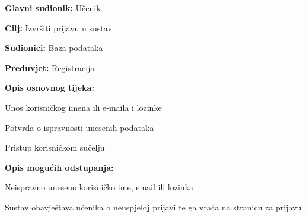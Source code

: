 					\noindent {}
					\begin{packed_item}
	
						\item \textbf{Glavni sudionik: }Učenik
						\item  \textbf{Cilj:} Izvršiti prijavu u sustav
						\item  \textbf{Sudionici:} Baza podataka
						\item  \textbf{Preduvjet:} Registracija
						\item  \textbf{Opis osnovnog tijeka:}
						
						\item[] \begin{packed_enum}
	
							\item Unos korisničkog imena ili e-maila i lozinke
							\item Potvrda o ispravnosti unesenih podataka
							\item Pristup korisničkom sučelju
						\end{packed_enum}
						
						\item  \textbf{Opis mogućih odstupanja:}
						
						\item[] \begin{packed_item}
	
							\item[2.a] Neispravno uneseno korisničko ime, email ili lozinka
							\item[] \begin{packed_enum}
								
								\item Sustav obavještava učenika o neuspjeloj prijavi te ga vraća na stranicu za prijavu
								
							\end{packed_enum}
							
						\end{packed_item}
					\end{packed_item}

